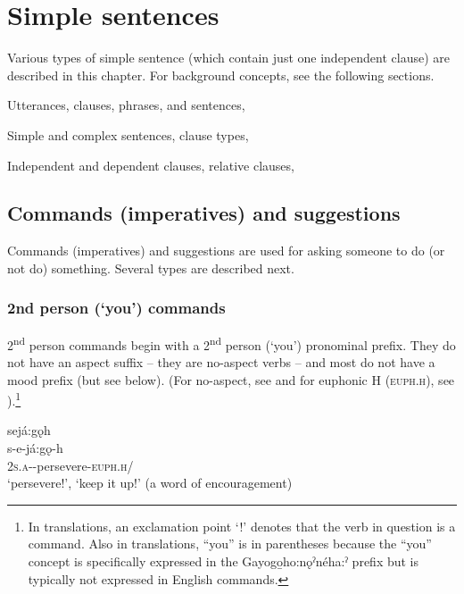 \chapter{Simple sentences} \label{Simple sentences}
Various types of simple sentence (which contain just one independent clause) are described in this chapter. For background concepts, see the following sections.

\begin{CayugaRelated}
\item Utterances, clauses, phrases, and sentences, \\
\item Simple and complex sentences, clause types, \\
\item Independent and dependent clauses, relative clauses, 
\end{CayugaRelated}

\section{Commands (imperatives) and suggestions} \label{Commands (imperatives) and suggestions}
Commands (imperatives) and suggestions are used for asking someone to do (or not do) something. Several types are described next. 

\subsection{2nd person (‘you’) commands} \label{2nd person (‘you’) commands}
2\textsuperscript{nd} person commands begin with a 2\textsuperscript{nd} person (‘you’) pronominal prefix. They do not have an aspect suffix  -- they are no-aspect verbs -- and most do not have a mood prefix (but see below). (For no-aspect, see  and for euphonic H (\textsc{euph.h}), see ).\footnote{In translations, an exclamation point ‘!’ denotes that the verb in question is a command. Also in translations, “you” is in parentheses because the “you” concept is specifically expressed in the Gayogo̱ho:nǫˀnéha:ˀ prefix but is typically not expressed in English commands.}

\ea\label{ex:commandex} {}
\ea sejá:gǫh \\
\gll s-e-já:gǫ-h \\
\textsc{2s.a}-{\joinerE}-persevere-\textsc{euph.h}/{\noaspect}\\
\glt ‘persevere!’, ‘keep it up!’ (a word of encouragement) 


